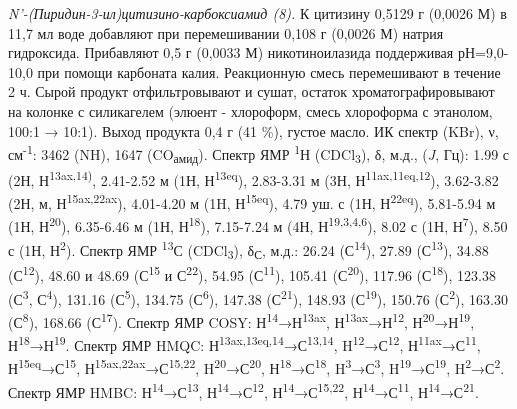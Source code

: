 \begin{multicols}{2}
\emph{N'-(Пиридин-3-ил)цитизино-карбоксиамид (8).} К цитизину 0,5129 г
(0,0026 М) в 11,7 мл воде добавляют при перемешивании 0,108 г (0,0026 М)
натрия гидроксида. Прибавляют 0,5 г (0,0033 М) никотиноилазида
поддерживая рН=9,0-10,0 при помощи карбоната калия. Реакционную смесь
перемешивают в течение 2 ч. Сырой продукт отфильтровывают и сушат,
остаток хроматографировывают на колонке с силикагелем (элюент -
хлороформ, смесь хлороформа с этанолом, 100:1 → 10:1). Выход продукта
0,4 г (41 \%), густое масло. ИК спектр (KBr), ν, см\textsuperscript{-1}:
3462 (NH), 1647 (CO\textsubscript{амид}). Спектр ЯМР
\textsuperscript{1}Н (CDCl\textsubscript{3}), δ, м.д., (\emph{J}, Гц):
1.99 с (2Н, Н\textsuperscript{13ax,14)}, 2.41-2.52 м (1Н,
Н\textsuperscript{13eq}), 2.83-3.31 м (3Н,
Н\textsuperscript{11ax,11eq,12}), 3.62-3.82 (2Н, м,
Н\textsuperscript{15ax,22ax}), 4.01-4.20 м (1H,
Н\textsuperscript{15eq}), 4.79 уш. с (1Н, Н\textsuperscript{22eq}),
5.81-5.94 м (1Н, Н\textsuperscript{20}), 6.35-6.46 м (1Н,
Н\textsuperscript{18}), 7.15-7.24 м (4Н, Н\textsuperscript{19,3,4,6}),
8.02 с (1Н, Н\textsuperscript{7}), 8.50 с (1Н, Н\textsuperscript{2}).
Спектр ЯМР \textsuperscript{13}С (CDCl\textsubscript{3}),
δ\textsubscript{С}, м.д.: 26.24 (С\textsuperscript{14}), 27.89
(С\textsuperscript{13}), 34.88 (С\textsuperscript{12}), 48.60 и 48.69
(С\textsuperscript{15} и С\textsuperscript{22}), 54.95
(С\textsuperscript{11}), 105.41 (С\textsuperscript{20}), 117.96
(С\textsuperscript{18}), 123.38 (С\textsuperscript{3},
С\textsuperscript{4}), 131.16 (С\textsuperscript{5}), 134.75
(С\textsuperscript{6}), 147.38 (С\textsuperscript{21}), 148.93
(С\textsuperscript{19}), 150.76 (С\textsuperscript{2}), 163.30
(С\textsuperscript{8}), 168.66 (С\textsuperscript{17}). Спектр ЯМР COSY:
Н\textsuperscript{14}→Н\textsuperscript{13ax},
Н\textsuperscript{13ax}→Н\textsuperscript{12},
Н\textsuperscript{20}→Н\textsuperscript{19},
Н\textsuperscript{18}→Н\textsuperscript{19}. Спектр ЯМР HMQC:
Н\textsuperscript{13ax,13eq,14}→С\textsuperscript{13,14},
H\textsuperscript{12}→С\textsuperscript{12},
Н\textsuperscript{11ax}→С\textsuperscript{11},
Н\textsuperscript{15eq}→С\textsuperscript{15},
Н\textsuperscript{15ax,22ax}→С\textsuperscript{15,22},
H\textsuperscript{20}→С\textsuperscript{20},
Н\textsuperscript{18}→С\textsuperscript{18},
H\textsuperscript{3}→С\textsuperscript{3},
H\textsuperscript{19}→С\textsuperscript{19},
H\textsuperscript{2}→С\textsuperscript{2}. Спектр ЯМР HMBC:
Н\textsuperscript{14}→С\textsuperscript{13},
Н\textsuperscript{14}→С\textsuperscript{12},
Н\textsuperscript{14}→С\textsuperscript{15,22},
Н\textsuperscript{14}→С\textsuperscript{11},
Н\textsuperscript{14}→С\textsuperscript{21}.
\end{multicols}

